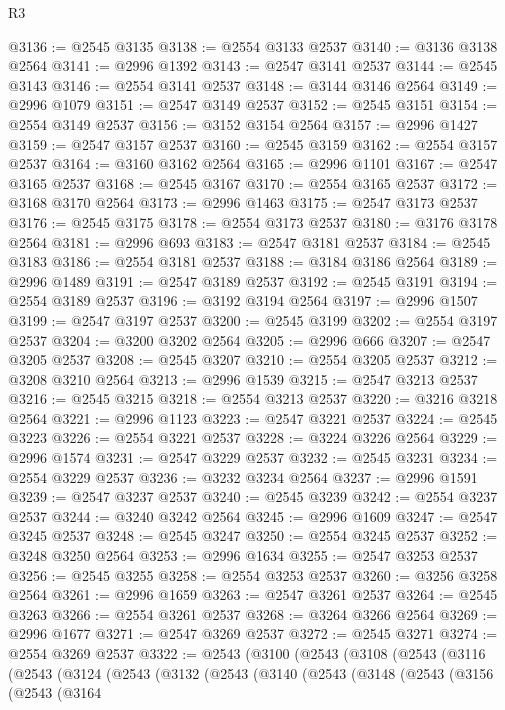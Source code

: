 \begin{lexlean}{R3}
\begin{coremodule}
@3136 := @2545 @3135
@3138 := @2554 @3133 @2537
@3140 := @3136 @3138 @2564
@3141 := @2996 @1392
@3143 := @2547 @3141 @2537
@3144 := @2545 @3143
@3146 := @2554 @3141 @2537
@3148 := @3144 @3146 @2564
@3149 := @2996 @1079
@3151 := @2547 @3149 @2537
@3152 := @2545 @3151
@3154 := @2554 @3149 @2537
@3156 := @3152 @3154 @2564
@3157 := @2996 @1427
@3159 := @2547 @3157 @2537
@3160 := @2545 @3159
@3162 := @2554 @3157 @2537
@3164 := @3160 @3162 @2564
@3165 := @2996 @1101
@3167 := @2547 @3165 @2537
@3168 := @2545 @3167
@3170 := @2554 @3165 @2537
@3172 := @3168 @3170 @2564
@3173 := @2996 @1463
@3175 := @2547 @3173 @2537
@3176 := @2545 @3175
@3178 := @2554 @3173 @2537
@3180 := @3176 @3178 @2564
@3181 := @2996 @693
@3183 := @2547 @3181 @2537
@3184 := @2545 @3183
@3186 := @2554 @3181 @2537
@3188 := @3184 @3186 @2564
@3189 := @2996 @1489
@3191 := @2547 @3189 @2537
@3192 := @2545 @3191
@3194 := @2554 @3189 @2537
@3196 := @3192 @3194 @2564
@3197 := @2996 @1507
@3199 := @2547 @3197 @2537
@3200 := @2545 @3199
@3202 := @2554 @3197 @2537
@3204 := @3200 @3202 @2564
@3205 := @2996 @666
@3207 := @2547 @3205 @2537
@3208 := @2545 @3207
@3210 := @2554 @3205 @2537
@3212 := @3208 @3210 @2564
@3213 := @2996 @1539
@3215 := @2547 @3213 @2537
@3216 := @2545 @3215
@3218 := @2554 @3213 @2537
@3220 := @3216 @3218 @2564
@3221 := @2996 @1123
@3223 := @2547 @3221 @2537
@3224 := @2545 @3223
@3226 := @2554 @3221 @2537
@3228 := @3224 @3226 @2564
@3229 := @2996 @1574
@3231 := @2547 @3229 @2537
@3232 := @2545 @3231
@3234 := @2554 @3229 @2537
@3236 := @3232 @3234 @2564
@3237 := @2996 @1591
@3239 := @2547 @3237 @2537
@3240 := @2545 @3239
@3242 := @2554 @3237 @2537
@3244 := @3240 @3242 @2564
@3245 := @2996 @1609
@3247 := @2547 @3245 @2537
@3248 := @2545 @3247
@3250 := @2554 @3245 @2537
@3252 := @3248 @3250 @2564
@3253 := @2996 @1634
@3255 := @2547 @3253 @2537
@3256 := @2545 @3255
@3258 := @2554 @3253 @2537
@3260 := @3256 @3258 @2564
@3261 := @2996 @1659
@3263 := @2547 @3261 @2537
@3264 := @2545 @3263
@3266 := @2554 @3261 @2537
@3268 := @3264 @3266 @2564
@3269 := @2996 @1677
@3271 := @2547 @3269 @2537
@3272 := @2545 @3271
@3274 := @2554 @3269 @2537
@3322 := @2543
    (@3100
      (@2543
        (@3108
          (@2543
            (@3116
              (@2543
                (@3124
                  (@2543
                    (@3132
                      (@2543
                        (@3140
                          (@2543
                            (@3148
                              (@2543
                                (@3156
                                  (@2543
                                    (@3164

\end{coremodule}
\end{lexlean}
